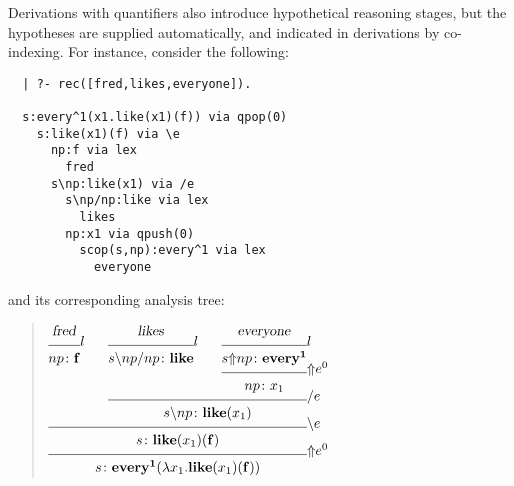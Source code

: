 
Derivations with quantifiers also introduce hypothetical reasoning
stages, but the hypotheses are supplied automatically, and indicated
in derivations by co-indexing.  For instance, consider the following:
%
\begin{verbatim}
  | ?- rec([fred,likes,everyone]).
  
  s:every^1(x1.like(x1)(f)) via qpop(0)
    s:like(x1)(f) via \e
      np:f via lex
        fred
      s\np:like(x1) via /e
        s\np/np:like via lex
          likes
        np:x1 via qpush(0)
          scop(s,np):every^1 via lex
            everyone
\end{verbatim}
%
and its corresponding analysis tree:
%
\begin{quote}
\small
$
\infr{\infr{\infr{\men{fred}}
                 {\synsem{np}
                         {\con{f}}}
                 {\lexr}
            \qquad
            \infr{\infr{\men{likes}}
                       {\synsem{\fd{\bk{s}
                                       {np}}
                                   {np}}
                               {\con{like}}}
                       {\lexr}
                  \qquad
                  \infr{\infr{\men{everyone}}
                             {\synsem{\scop{s}
                                           {np}}
                                     {\con{every^1}}}
                             {\lexr}}
                       {\synsem{np}
                               {x_1}}
                       {\qpush{0}}}
                 {\synsem{\bk{s}
                             {np}}
                         {\con{like}
                          (x_1)}}
                 {\fel}}
           {\synsem{s}
                   {\con{like}
                    (x_1)
                    (\con{f})}}
           {\bel}}
     {\synsem{s}
             {\con{every^1}
              (\lam{x_1}
                   {\con{like}
                    (x_1)
                    (\con{f})})}}
     {\qpop{0}}
$
\end{quote}



